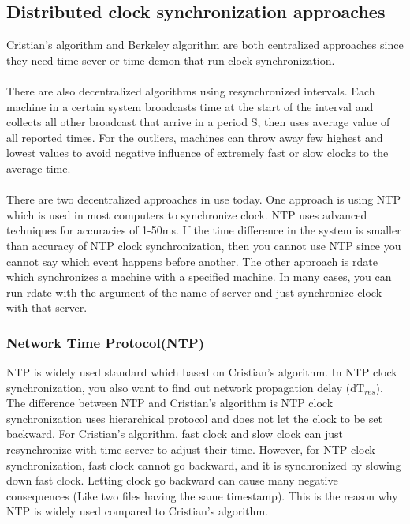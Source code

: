 \documentclass[twoside]{article}
\begin{document}
\subsection{Distributed clock synchronization approaches}
Cristian’s algorithm and Berkeley algorithm are both centralized approaches since they need time sever or time demon that run clock synchronization.\\\\
There are also decentralized algorithms using resynchronized intervals. Each machine in a certain system broadcasts time at the start of the interval and collects all other broadcast that arrive in a period S, then uses average value of all reported times. For the outliers, machines can throw away few highest and lowest values to avoid negative influence of extremely fast or slow clocks to the average time. \\\\
There are two decentralized approaches in use today. One approach is using NTP which is used in most computers to synchronize clock. NTP uses advanced techniques for accuracies of 1-50ms. If the time difference in the system is smaller than accuracy of NTP clock synchronization, then you cannot use NTP since you cannot say which event happens before another. The other approach is rdate which synchronizes a machine with a specified machine. In many cases, you can run rdate with the argument of the name of server and just synchronize clock with that server. 

\subsubsection{Network Time Protocol(NTP)}
NTP is widely used standard which based on Cristian’s algorithm. In NTP clock synchronization, you also want to find out network propagation delay (dT$_{res}$). The difference between NTP and Cristian’s algorithm is NTP clock synchronization uses hierarchical protocol and does not let the clock to be set backward. For Cristian’s algorithm, fast clock and slow clock can just resynchronize with time server to adjust their time. However, for NTP clock synchronization, fast clock cannot go backward, and it is synchronized by slowing down fast clock. Letting clock go backward can cause many negative consequences (Like two files having the same timestamp). This is the reason why NTP is widely used compared to Cristian’s algorithm.
\end{document}
